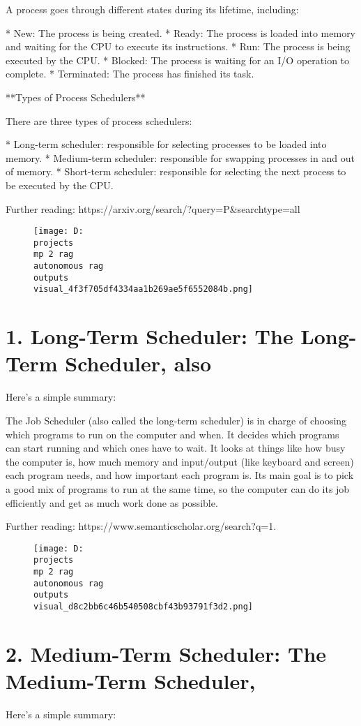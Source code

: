 \documentclass[12pt,a4paper]{article}
\begin{document}
A process goes through different states during its lifetime, including:

* New: The process is being created.
* Ready: The process is loaded into memory and waiting for the CPU to execute its instructions.
* Run: The process is being executed by the CPU.
* Blocked: The process is waiting for an I/O operation to complete.
* Terminated: The process has finished its task.

**Types of Process Schedulers**

There are three types of process schedulers:

* Long-term scheduler: responsible for selecting processes to be loaded into memory.
* Medium-term scheduler: responsible for swapping processes in and out of memory.
* Short-term scheduler: responsible for selecting the next process to be executed by the CPU.

Further reading: https://arxiv.org/search/?query=P&searchtype=all
\begin{figure}[h]
\centering
\texttt{[image: D:\\projects\\mp 2 rag\\autonomous rag\\outputs\\visual\_4f3f705df4334aa1b269ae5f6552084b.png]}
\end{figure}
\section{1. Long-Term Scheduler: The Long-Term Scheduler, also}
Here's a simple summary:

The Job Scheduler (also called the long-term scheduler) is in charge of choosing which programs to run on the computer and when. It decides which programs can start running and which ones have to wait. It looks at things like how busy the computer is, how much memory and input/output (like keyboard and screen) each program needs, and how important each program is. Its main goal is to pick a good mix of programs to run at the same time, so the computer can do its job efficiently and get as much work done as possible.

Further reading: https://www.semanticscholar.org/search?q=1.%
\begin{figure}[h]
\centering
\texttt{[image: D:\\projects\\mp 2 rag\\autonomous rag\\outputs\\visual\_d8c2bb6c46b540508cbf43b93791f3d2.png]}
\end{figure}
\section{2. Medium-Term Scheduler: The Medium-Term Scheduler,}
Here's a simple summary:
\end{document}
